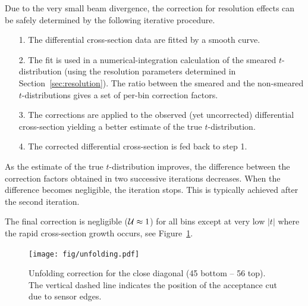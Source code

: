 Due to the very small beam divergence, the correction for resolution effects can be safely determined by the following iterative procedure.
\begin{itemize}
\item[1.] The differential cross-section data are fitted by a smooth curve.
\item[2.] The fit is used in a numerical-integration calculation of the smeared $t$-distribution (using the resolution parameters determined in Section~\ref{sec:resolution}). The ratio between the smeared and the non-smeared $t$-distributions gives a set of per-bin correction factors.
\item[3.] The corrections are applied to the observed (yet uncorrected) differential cross-section yielding a better estimate of the true $t$-distribution.
\item[4.] The corrected differential cross-section is fed back to step 1.
\end{itemize}
As the estimate of the true $t$-distribution improves, the difference between the correction factors obtained in two successive iterations decreases. When the difference becomes negligible, the iteration stops. This is typically achieved after the second iteration. 

The final correction is negligible (${\cal U} \approx 1$) for all bins except at very low $|t|$ where the rapid cross-section growth occurs, see Figure~\ref{fig:unfolding}.

\begin{figure}
\begin{center}
\texttt{[image: fig/unfolding.pdf]}
\caption{%
Unfolding correction for the close diagonal (45 bottom -- 56 top). The vertical dashed line indicates the position of the acceptance cut due to sensor edges.
}
\label{fig:unfolding}
\end{center}
\end{figure}

